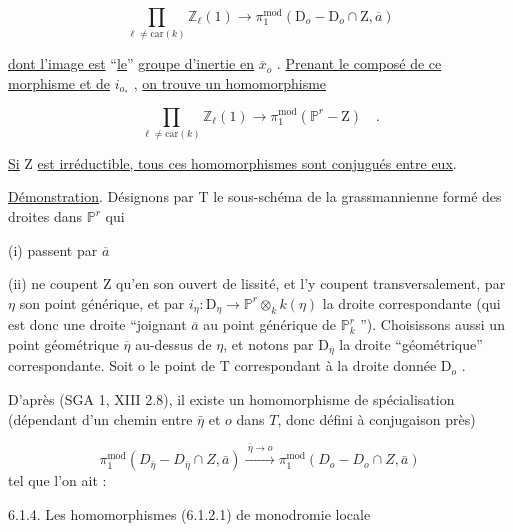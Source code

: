 \begin{equation}\tag{6.1.2.1}
\prod\limits_{\ell \neq \mathrm{car}(k)} \mathbb{Z}_\ell(1) \longrightarrow \pi_1^{\mathrm{mod}}(\mathrm{D}_o - \mathrm{D}_o \cap \mathrm{Z}, \overline{a})
\end{equation}

\underline{dont l'image est} ``\underline{le}'' \underline{groupe d'inertie en} $\overline{x}_o$ . \underline{Prenant le composé de ce morphisme et de} $i_{o_*}$ , \underline{on trouve un homomorphisme}

\begin{equation}\tag{6.1.2.2}
\prod\limits_{\ell \neq \mathrm{car}(k)} \mathbb{Z}_\ell(1) \longrightarrow \pi_1^{\mathrm{mod}}(\mathbb{P}^r - \mathrm{Z}) \quad .
\end{equation}

\underline{Si} Z \underline{est irréductible, tous ces homomorphismes sont conjugués entre eux}.

\underline{Démonstration}. Désignons par T le sous-schéma de la grassmannienne formé des droites dans $\mathbb{P}^r$ qui

(i) passent par $\overline{a}$

(ii) ne coupent Z qu'en son ouvert de lissité, et l'y coupent transversalement, par $\eta$ son point générique, et par $i_\eta : \mathrm{D}_\eta \longrightarrow \mathbb{P}^r \otimes_k k(\eta)$ la droite correspondante (qui est donc une droite ``joignant $\overline{a}$ au point générique de $\mathbb{P}^r_k$ ''). Choisissons aussi un point géométrique $\overline{\eta}$ au-dessus de $\eta$, et notons par $\mathrm{D}_{\overline{\eta}}$ la droite ``géométrique'' correspondante. Soit o le point de T correspondant à la droite donnée $\mathrm{D}_o$ .



D'après (SGA 1, XIII 2.8), il existe un homomorphisme de spécialisation (dépendant d'un chemin entre $\bar{\eta}$ et $o$ dans $T$, donc défini à conjugaison près)

\begin{equation}\tag{6.1.3}
\pi_1^{\mathrm{mod}}(D_{\bar{\eta}} - D_{\bar{\eta}} \cap Z, \bar{a}) \xrightarrow{\ \bar{\eta} \longrightarrow o\ } \pi_1^{\mathrm{mod}}(D_o - D_o \cap Z, \bar{a})
\end{equation}
tel que l'on ait :

6.1.4. Les homomorphismes (6.1.2.1) de monodromie locale

